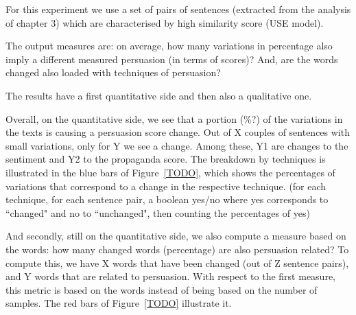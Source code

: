 For this experiment we use a set of pairs of sentences (extracted from the analysis of chapter 3) which are characterised by high similarity score (USE model). 


The output measures are: on average, how many variations in percentage also imply a different measured persuasion (in terms of scores)? %
And, are the words changed also loaded with techniques of persuasion? 

The results have a first quantitative side and then also a qualitative one.


Overall, on the quantitative side, we see that a portion (\%?) of the variations in the texts is causing a persuasion score change. Out of X couples of sentences with small variations, only for Y we see a change. Among these, Y1 are changes to the sentiment and Y2 to the propaganda score. The breakdown by techniques is illustrated in the blue bars of Figure~\ref{TODO}, which shows the percentages of variations that correspond to a change in the respective technique. (for each technique, for each sentence pair, a boolean yes/no where yes corresponds to ``changed" and no to ``unchanged", then counting the percentages of yes)


And secondly, still on the quantitative side, we also compute a measure based on the words: how many changed words (percentage) are also persuasion related? To compute this, we have X words that have been changed (out of Z sentence pairs), and Y words that are related to persuasion.
With respect to the first measure, this metric is based on the words instead of being based on the number of samples. The red bars of Figure~\ref{TODO} illustrate it.


